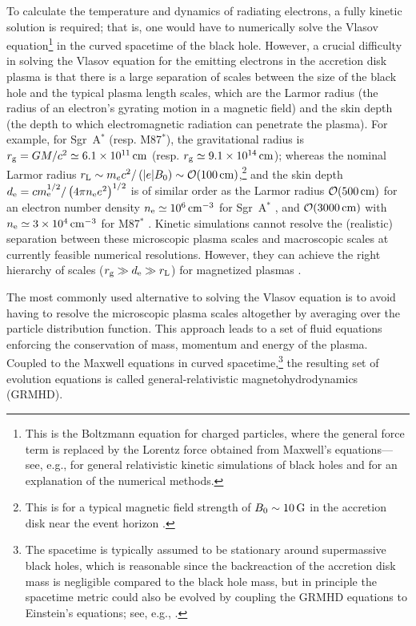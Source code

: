 \documentclass[graybox,envcountchap]{svmult}
\newcommand{\pa}[1]{\left(#1\right)}
\begin{document}
To calculate the temperature and dynamics of radiating electrons, a fully kinetic solution is required; that is, one would have to numerically solve the Vlasov equation\footnote{This is the Boltzmann equation for charged particles, where the general force term is replaced by the Lorentz force obtained from Maxwell's equations---see, e.g., \cite{Parfrey2019,Crinquand2022,Galishnikova2023a} for general relativistic kinetic simulations of black holes and \cite{Bacchini2019,Bacchini2020} for an explanation of the numerical methods.} in the curved spacetime of the black hole. However, a crucial difficulty in solving the Vlasov equation for the emitting electrons in the accretion disk plasma is that there is a large separation of scales between the size of the black hole and the typical plasma length scales, which are the Larmor radius (the radius of an electron's gyrating motion in a magnetic field) and the skin depth (the depth to which electromagnetic radiation can penetrate the plasma).
For example, for Sgr~A$^*$ (resp. M87$^*$), the gravitational radius is $r_{\rm g}=GM/c^2\simeq6.1\times10^{11}\,\rm{cm}$ (resp. $r_{\rm g}\simeq9.1\times10^{14}\,\rm{cm}$); whereas the nominal Larmor radius $r_{\rm L}\sim m_e c^2/\pa{|e|B_0}\sim\mathcal{O}(100\,\rm{cm})$,\footnote{This is for a typical magnetic field strength of $B_0\sim10\,\rm{G}$ in the accretion disk near the event horizon \cite{EHT2019V,EHT2022V}.} and the skin depth $d_{\rm e}=cm_{\rm e}^{1/2}/\pa{4\pi n_{\rm e}e^2}^{1/2}$ is of similar order as the Larmor radius $\mathcal{O}(500\,\rm{cm})$ for an electron number density $n_{\rm e}\simeq 10^6\,\rm{cm}^{-3}$ for Sgr~A$^*$ \cite{EHT2022V}, and $\mathcal{O}(3000\,\rm{cm})$ with $n_{\rm e}\simeq3\times 10^4\,\rm{cm}^{-3}$ for M87$^*$ \cite{EHT2019V}.
Kinetic simulations cannot resolve the (realistic) separation between these microscopic plasma scales and macroscopic scales at currently feasible numerical resolutions.
However, they can achieve the right hierarchy of scales ($r_{\rm g}\gg d_{\rm e}\gg r_{\rm L}$) for magnetized plasmas  \cite{Levinson2018,Parfrey2019,Crinquand2020,Chen2020,Crinquand2022,Galishnikova2023a}.

The most commonly used alternative to solving the Vlasov equation is to avoid having to resolve the microscopic plasma scales altogether by averaging over the particle distribution function.
This approach leads to a set of fluid equations enforcing the conservation of mass, momentum and energy of the plasma.
Coupled to the Maxwell equations in curved spacetime,\footnote{The spacetime is typically assumed to be stationary around supermassive black holes, which is reasonable since the backreaction of the accretion disk mass is negligible compared to the black hole mass, but in principle the spacetime metric could also be evolved by coupling the GRMHD equations to Einstein's equations; see, e.g., \cite{Duez2005,Shibata2005,Anderson2008,Mosta2014,Most2019,Cheong2020,Combi2023,Cook2023}.} the resulting set of evolution equations is called general-relativistic magnetohydrodynamics (GRMHD).
\end{document}
